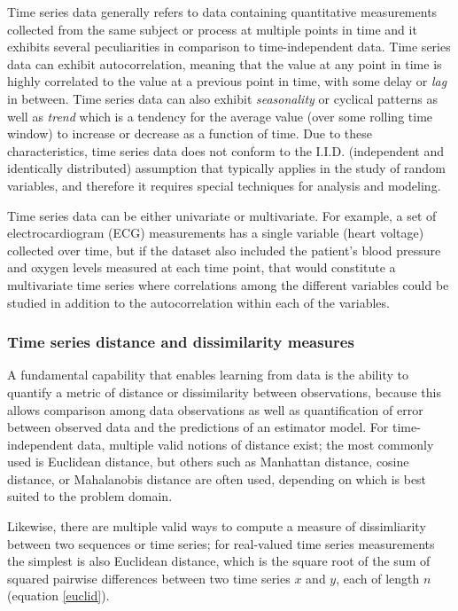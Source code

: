 \documentclass[12pt, letterpaper]{article}
\begin{document}
Time series data generally refers to data containing quantitative measurements
collected from the same subject or process at multiple points in time and it
exhibits several peculiarities in comparison to time-independent data. Time
series data can exhibit autocorrelation, meaning that the value at any point in
time is highly correlated to the value at a previous point in time, with some
delay or \emph{lag} in between. Time series data can also exhibit
\emph{seasonality} or cyclical patterns as well as \emph{trend} which is a
tendency for the average value (over some rolling time window) to increase or
decrease as a function of time. Due to these characteristics, time series data
does not conform to the I.I.D. (independent and identically distributed)
assumption that typically applies in the study of random variables, and
therefore it requires special techniques for analysis and modeling.

Time series data can be either univariate or multivariate. For example, a set of
electrocardiogram (ECG) measurements has a single variable (heart voltage)
collected over time, but if the dataset also included the patient's blood
pressure and oxygen levels measured at each time point, that would constitute a
multivariate time series where correlations among the different variables could
be studied in addition to the autocorrelation within each of the variables.

\subsubsection{Time series distance and dissimilarity measures}

A fundamental capability that enables learning from data is the ability to
quantify a metric of distance or dissimilarity between observations, because
this allows comparison among data observations as well as quantification of
error between observed data and the predictions of an estimator model. For
time-independent data, multiple valid notions of distance exist; the most
commonly used is Euclidean distance, but others such as Manhattan distance,
cosine distance, or Mahalanobis distance are often used, depending on which is
best suited to the problem domain.

Likewise, there are multiple valid ways to compute a measure of dissimliarity
between two sequences or time series; for real-valued time series measurements
the simplest is also Euclidean distance, which is the square root of the sum of
squared pairwise differences between two time series $x$ and $y$, each of length
$n$ (equation \ref{euclid}).
\end{document}
